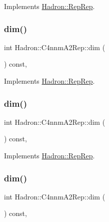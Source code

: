 Implements \mbox{\hyperlink{structHadron_1_1RepRep_a92c8802e5ed7afd7da43ccfd5b7cd92b}{Hadron\+::\+Rep\+Rep}}.

\mbox{\label{structHadron_1_1C4nnmA2Rep_a02dd57918f08f3c16982ad3f17b8fe8f}} 
\subsubsection{\texorpdfstring{dim()}{dim()}\hspace{0.1cm}{\footnotesize\ttfamily [3/5]}}
{\footnotesize\ttfamily int Hadron\+::\+C4nnm\+A2\+Rep\+::dim (\begin{DoxyParamCaption}{ }\end{DoxyParamCaption}) const\hspace{0.3cm}{\ttfamily [inline]}, {\ttfamily [virtual]}}



Implements \mbox{\hyperlink{structHadron_1_1RepRep_a92c8802e5ed7afd7da43ccfd5b7cd92b}{Hadron\+::\+Rep\+Rep}}.

\mbox{\label{structHadron_1_1C4nnmA2Rep_a02dd57918f08f3c16982ad3f17b8fe8f}} 
\subsubsection{\texorpdfstring{dim()}{dim()}\hspace{0.1cm}{\footnotesize\ttfamily [4/5]}}
{\footnotesize\ttfamily int Hadron\+::\+C4nnm\+A2\+Rep\+::dim (\begin{DoxyParamCaption}{ }\end{DoxyParamCaption}) const\hspace{0.3cm}{\ttfamily [inline]}, {\ttfamily [virtual]}}



Implements \mbox{\hyperlink{structHadron_1_1RepRep_a92c8802e5ed7afd7da43ccfd5b7cd92b}{Hadron\+::\+Rep\+Rep}}.

\mbox{\label{structHadron_1_1C4nnmA2Rep_a02dd57918f08f3c16982ad3f17b8fe8f}} 
\subsubsection{\texorpdfstring{dim()}{dim()}\hspace{0.1cm}{\footnotesize\ttfamily [5/5]}}
{\footnotesize\ttfamily int Hadron\+::\+C4nnm\+A2\+Rep\+::dim (\begin{DoxyParamCaption}{ }\end{DoxyParamCaption}) const\hspace{0.3cm}{\ttfamily [inline]}, {\ttfamily [virtual]}}




